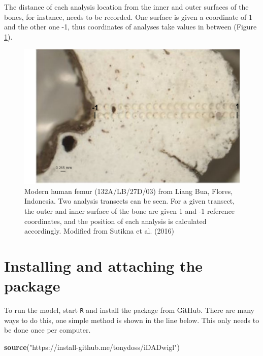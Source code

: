 \documentclass[]{elsarticle} %
\newenvironment{Shaded}{\begin{snugshade}}{\end{snugshade}}
\newcommand{\KeywordTok}[1]{\textcolor[rgb]{0.13,0.29,0.53}{\textbf{#1}}}
\newcommand{\NormalTok}[1]{#1}
\newcommand{\StringTok}[1]{\textcolor[rgb]{0.31,0.60,0.02}{#1}}
\begin{document}
The distance of each analysis location from the inner and outer surfaces of the bones, for instance, needs to be recorded. One surface is given a coordinate of 1 and the other one -1, thus coordinates of analyses take values in between (Figure \ref{fig:femurpic}).



\begin{figure}
\includegraphics[width=0.95\linewidth]{figures/bone} \caption{Modern human femur (132A/LB/27D/03) from Liang Bua, Flores, Indonesia. Two analysis transects can be seen. For a given transect, the outer and inner surface of the bone are given 1 and -1 reference coordinates, and the position of each analysis is calculated accordingly. Modified from Sutikna et al. (2016)}\label{fig:femurpic}
\end{figure}

\FloatBarrier

\hypertarget{installing-and-attaching-the-package}{%
\section{Installing and attaching the package}\label{installing-and-attaching-the-package}}

To run the model, start \texttt{R} and install the package from GitHub. There are many ways to do this, one simple method is shown in the line below. This only needs to be done once per computer.

\begin{Shaded}
\begin{Highlighting}[]
\KeywordTok{source}\NormalTok{(}\StringTok{"https://install-github.me/tonydoss/iDADwigl"}\NormalTok{)}
\end{Highlighting}
\end{Shaded}
\end{document}

